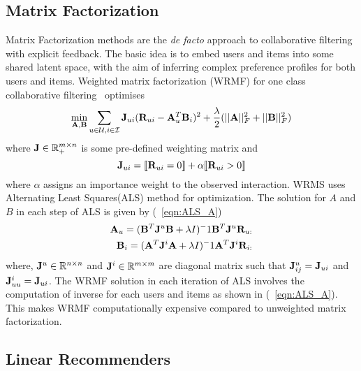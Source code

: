 \subsection{Matrix Factorization}

Matrix Factorization methods are the \emph{de facto} approach to collaborative filtering with explicit feedback. The basic idea is to embed users and items into some shared latent space, with the aim of inferring complex preference profiles for both users and items. 
Weighted matrix factorization (WRMF) for one class collaborative filtering~\cite{Hu:2008, Pan:2009} optimises
\begin{equation}
\label{eqn:wrmf}
\min_{ \mathbf{A},\mathbf{B}  } \sum_{ u \in \mathcal{U}, i \in \mathcal{I} } \mathbf{J}_{ui} ( \mathbf{R}_{ui} - \mathbf{A}_u^T \mathbf{B}_i )^2 + \frac{\lambda}{2}  ( ||\mathbf{A}||_F^2 + ||\mathbf{B}||_F^2 )
\end{equation}
where 
$\mathbf{J} \in \mathbb{R}_+^{m \times n}$ is some pre-defined weighting matrix  and 
\begin{equation}
\label{eqn:wrmf-weight}
\mathbf{J}_{ui} =  \llbracket  \mathbf{R}_{ui} = 0  \rrbracket + \alpha \llbracket  \mathbf{R}_{ui} > 0  \rrbracket 
\end{equation}
where $\alpha$ assigns an importance weight to the observed interaction.
WRMS uses Alternating Least Squares(ALS) method for optimization. The solution for $A$ and $B$ in each step of ALS is given by (~\ref{eqn:ALS_A})
\begin{align}
	\label{eqn:ALS_A}
	\begin{split}
	\mathbf{A}_u = (\mathbf{B}^T \mathbf{J}^u \mathbf{B} + \lambda I)^-1 \mathbf{B}^T \mathbf{J}^u \mathbf{R}_{u:} \\
	\mathbf{B}_i = (\mathbf{A}^T \mathbf{J}^i \mathbf{A} + \lambda I)^-1 \mathbf{A}^T \mathbf{J}^i \mathbf{R}_{i:} 
	\end{split}
\end{align}
where, $\mathbf{J}^u \in \mathbb{R}^{n \times n}$ and $\mathbf{J}^i \in \mathbb{R}^{m \times m}$ are diagonal matrix such that $ \mathbf{J}^u_{ij} = \mathbf{J}_{ui}$ and  $\mathbf{J}^i_{uu} = \mathbf{J}_{ui}$. The WRMF solution in each iteration of ALS involves the computation of inverse for each users and items as shown in (~\ref{eqn:ALS_A}). This makes WRMF computationally expensive compared to unweighted matrix factorization.


\subsection{Linear Recommenders}

